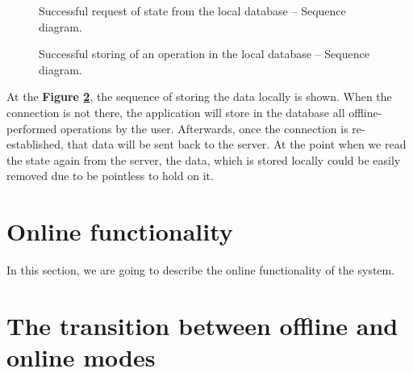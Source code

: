 \begin{figure}[!htb]
    \begin{center}
    \def\svgwidth{\columnwidth}
    
    \caption {Successful request of state from the local database -- Sequence diagram.}
    \label{fig:design6}
\end{center}
\end{figure}


\begin{figure}[!htb]
    \begin{center}
    \def\svgwidth{\columnwidth}
    
    \caption {Successful storing of an operation in the local database -- Sequence diagram.}
    \label{fig:design7}
\end{center}
\end{figure}

At the \textbf{Figure \ref{fig:design7}}, the sequence of storing the data locally is shown. When the connection is not there, the application will store in the database all offline-performed operations by the user. Afterwards, once the connection is re-established, that data will be sent back to the server. At the point when we read the state again from the server, the data, which is stored locally could be easily removed due to be pointless to hold on it. 


\section {Online functionality}

In this section, we are going to describe the online functionality of the system.



\section {The transition between offline and online modes}